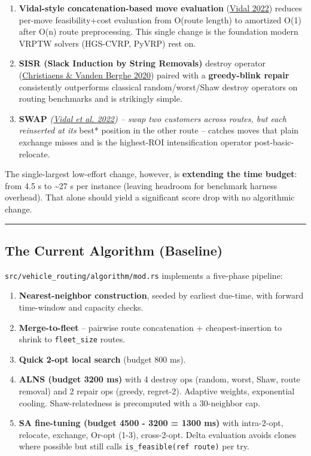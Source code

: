\documentclass[twocolumn,10pt,letterpaper]{article}
\begin{document}
\begin{enumerate}
\setlength{\itemsep}{0pt}
\setlength{\parskip}{0pt}
  \item \textbf{Vidal-style concatenation-based move evaluation} (\href{https://arxiv.org/abs/2012.10384}{Vidal 2022}) reduces per-move feasibility+cost evaluation from O(route length) to amortized O(1) after O(n) route preprocessing. This single change is the foundation modern VRPTW solvers (HGS-CVRP, PyVRP) rest on.
  \item \textbf{SISR (Slack Induction by String Removals)} destroy operator (\href{https://pubsonline.informs.org/doi/10.1287/trsc.2019.0914}{Christiaens \& Vanden Berghe 2020}) paired with a \textbf{greedy-blink repair} consistently outperforms classical random/worst/Shaw destroy operators on routing benchmarks and is strikingly simple.
  \item \textbf{SWAP}\textit{ (\href{https://arxiv.org/abs/2012.10384}{Vidal et al. 2022}) -- swap two customers across routes, but each reinserted at its }best* position in the other route -- catches moves that plain exchange misses and is the highest-ROI intensification operator post-basic-relocate.
\end{enumerate}

The single-largest low-effort change, however, is \textbf{extending the time budget}: from 4.5 s to \textasciitilde{}27 s per instance (leaving headroom for benchmark harness overhead). That alone should yield a significant score drop with no algorithmic change.


\vspace{0.5em}
\noindent\rule{\columnwidth}{0.4pt}
\vspace{0.5em}

\subsection{The Current Algorithm (Baseline)}

\texttt{src/\allowbreak vehicle\_routing/\allowbreak algorithm/\allowbreak mod.rs} implements a five-phase pipeline:


\begin{enumerate}
\setlength{\itemsep}{0pt}
\setlength{\parskip}{0pt}
  \item \textbf{Nearest-neighbor construction}, seeded by earliest due-time, with forward time-window and capacity checks.
  \item \textbf{Merge-to-fleet} -- pairwise route concatenation + cheapest-insertion to shrink to \texttt{fleet\_size} routes.
  \item \textbf{Quick 2-opt local search} (budget 800 ms).
  \item \textbf{ALNS (budget 3200 ms)} with 4 destroy ops (random, worst, Shaw, route removal) and 2 repair ops (greedy, regret-2). Adaptive weights, exponential cooling. Shaw-relatedness is precomputed with a 30-neighbor cap.
  \item \textbf{SA fine-tuning (budget 4500 - 3200 = 1300 ms)} with intra-2-opt, relocate, exchange, Or-opt (1-3), cross-2-opt. Delta evaluation avoids clones where possible but still calls \texttt{is\_feasible(ref route)} per try.
\end{enumerate}
\end{document}
